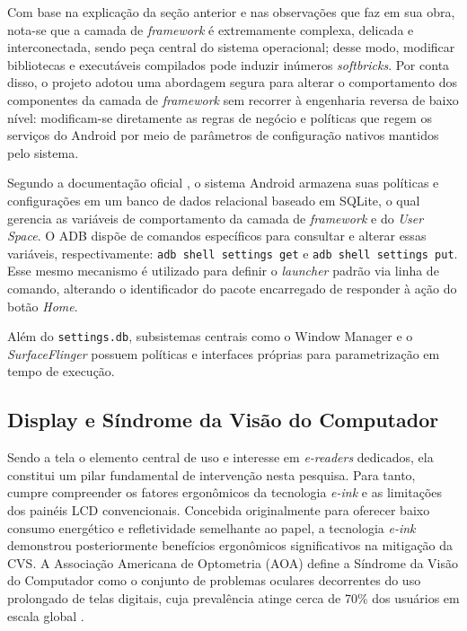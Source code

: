 \documentclass[
    12pt,
    openright,
    oneside,
    a4paper,
    english,
    brazilian
    ]{abntex2}
\begin{document}
Com base na explicação da seção anterior e nas observações que  faz em sua obra, nota-se que a camada de \textit{framework} é extremamente complexa, delicada e interconectada, sendo peça central do sistema operacional; desse modo, modificar bibliotecas e executáveis compilados pode induzir inúmeros \textit{softbricks}. Por conta disso, o projeto adotou uma abordagem segura para alterar o comportamento dos componentes da camada de \textit{framework} sem recorrer à engenharia reversa de baixo nível: modificam-se diretamente as regras de negócio e políticas que regem os serviços do Android por meio de parâmetros de configuração nativos mantidos pelo sistema.

Segundo a documentação oficial \cite{android2025, aosp2024}, o sistema Android armazena suas políticas e configurações em um banco de dados relacional baseado em SQLite, o qual gerencia as variáveis de comportamento da camada de \textit{framework} e do \textit{User Space}. O ADB dispõe de comandos específicos para consultar e alterar essas variáveis, respectivamente: \texttt{adb shell settings get} e \texttt{adb shell settings put}. Esse mesmo mecanismo é utilizado para definir o \textit{launcher} padrão via linha de comando, alterando o identificador do pacote encarregado de responder à ação do botão \textit{Home}.

Além do \texttt{settings.db}, subsistemas centrais como o Window Manager e o \textit{SurfaceFlinger} possuem políticas e interfaces próprias para parametrização em tempo de execução.

\subsection{Display e Síndrome da Visão do Computador}

Sendo a tela o elemento central de uso e interesse em \textit{e-readers} dedicados, ela constitui um pilar fundamental de intervenção nesta pesquisa. Para tanto, cumpre compreender os fatores ergonômicos da tecnologia \textit{e-ink} e as limitações dos painéis LCD convencionais. Concebida originalmente para oferecer baixo consumo energético e refletividade semelhante ao papel, a tecnologia \textit{e-ink} demonstrou posteriormente benefícios ergonômicos significativos na mitigação da CVS. A Associação Americana de Optometria (AOA) define a Síndrome da Visão do Computador como o conjunto de problemas oculares decorrentes do uso prolongado de telas digitais, cuja prevalência atinge cerca de 70\% dos usuários em escala global \cite{sa2016}.
\end{document}
